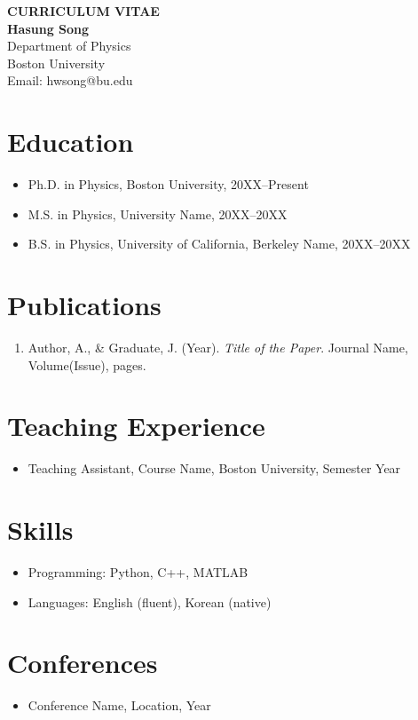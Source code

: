 
\begin{center}
    {\LARGE \bf CURRICULUM VITAE}\\[0.5in]
    {\large \bf Hasung Song}\\[0.1in]
    Department of Physics\\
    Boston University\\
    Email: hwsong@bu.edu\\
\end{center}

\vspace{0.3in}

\section*{Education}
\begin{itemize}
    \item Ph.D. in Physics, Boston University, 20XX--Present
    \item M.S. in Physics, University Name, 20XX--20XX
    \item B.S. in Physics, University of California, Berkeley Name, 20XX--20XX
\end{itemize}

\section*{Publications}
\begin{enumerate}
    \item Author, A., \& Graduate, J. (Year). \emph{Title of the Paper}. Journal Name, Volume(Issue), pages.
\end{enumerate}

\section*{Teaching Experience}
\begin{itemize}
    \item Teaching Assistant, Course Name, Boston University, Semester Year
\end{itemize}

\section*{Skills}
\begin{itemize}
    \item Programming: Python, C++, MATLAB
    \item Languages: English (fluent), Korean (native)
\end{itemize}

\section*{Conferences}
\begin{itemize}
    \item Conference Name, Location, Year
\end{itemize}
